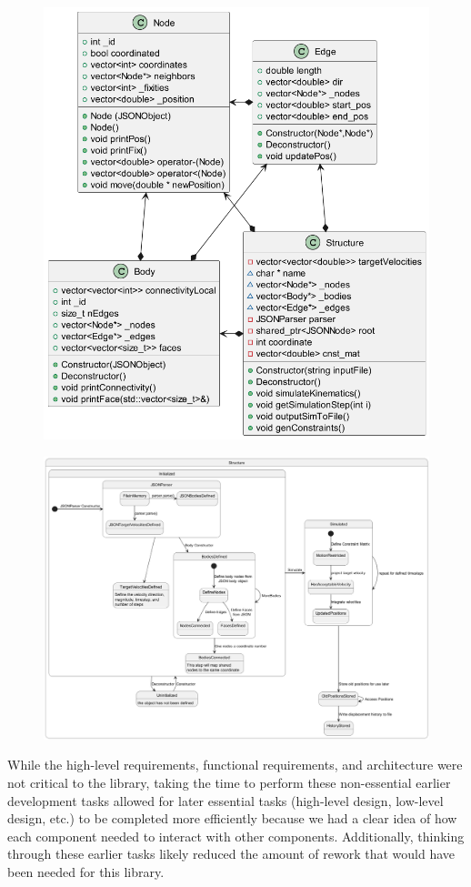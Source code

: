 \begin{figure} [H]
\centering
  \centering
  \includegraphics[width=0.7\linewidth]{Graphics/classNew.png}
  \label{fig:class}
  \end{figure}
\begin{figure} [H]
  \centering
  \includegraphics[width=0.7\linewidth]{Graphics/stateNew.png}
  \label{fig:state}
\end{figure}
While the high-level requirements, functional requirements, and architecture were not critical to the library, taking the time to perform these non-essential earlier development tasks allowed for later essential tasks (high-level design, low-level design, etc.) to be completed more efficiently because we had a clear idea of how each component needed to interact with other components. Additionally, thinking through these earlier tasks likely reduced the amount of rework that would have been needed for this library.

